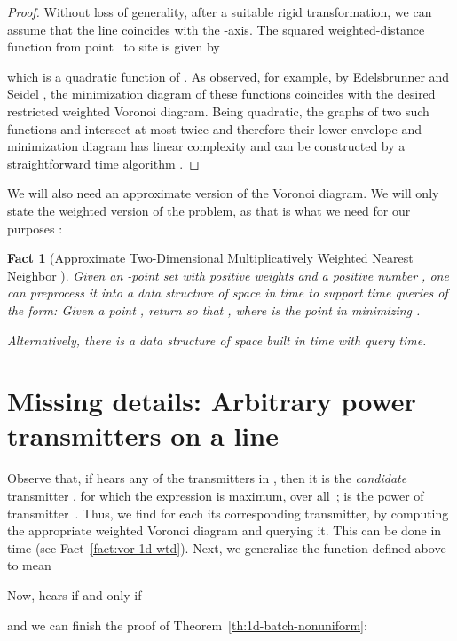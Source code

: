 \documentclass[11pt]{article}
\newtheorem{theorem}{Theorem}[section]
\newtheorem{fact}[theorem]{Fact}
\theoremstyle{remark}
\newcommand{\old}[1]{{{}}}
\begin{document}
\begin{proof}
  Without loss of generality, after a suitable rigid transformation,
  we can assume that the line coincides with the -axis.  The
  squared weighted-distance function  from point~ to site  is
  given by
  
  which is a quadratic function of .  As observed, for example, by
  Edelsbrunner and Seidel \cite{es-vda-86}, the minimization diagram
  of these functions coincides with the desired restricted weighted
  Voronoi diagram.  Being quadratic, the graphs of two such functions
   and  intersect at most twice and therefore their
  lower envelope and minimization diagram has linear complexity and
  can be constructed by a straightforward  time
  algorithm \cite[Theorem~6.1]{sa-dsstg-95}. 
\end{proof}



We will also need an approximate version of the Voronoi diagram.  We will only state the weighted version of the problem, as that is what we need for our purposes \cite[Theorem~2.16]{wann}:

\begin{fact}[Approximate Two-Dimensional Multiplicatively Weighted Nearest Neighbor \cite{wann}]
  \label{fact:2d-ann-wtd}
  Given an -point set  with positive weights
   and a positive number , one can preprocess it into a data structure of space  in time  to support   time queries of the form: Given a point , return  so that , where  is the point in  minimizing .

  Alternatively, there is a data structure of space   built in time  with  query time.
\end{fact}

\iffalse
\section{Missing details: Arbitrary power transmitters on a line}
\label{sec:1d-non-uni-details}
Observe that, if  hears any of the transmitters in , then it is the \emph{candidate} transmitter , for which the expression  is maximum, over all~;  is the power of transmitter~. 
Thus, we find for each  its corresponding transmitter, by
computing the appropriate weighted Voronoi diagram and querying it. This can be done in  time (see Fact~\ref{fact:vor-1d-wtd}).  
Next, we generalize the function  defined above to mean

Now,  hears  if and only if 

and we can finish the proof of Theorem~\ref{th:1d-batch-nonuniform}:
\old{
\begin{theorem}
  \label{th:1d-batch-nonuniform}
  For any fixed positive even integer , given a set  of
  transmitters (not necessarily all of the same power) and a set 
  of receivers, of sizes  and  respectively, we can determine
  which, if any, transmitter is received by each receiver in total
  time .
\end{theorem}
}
\end{document}
